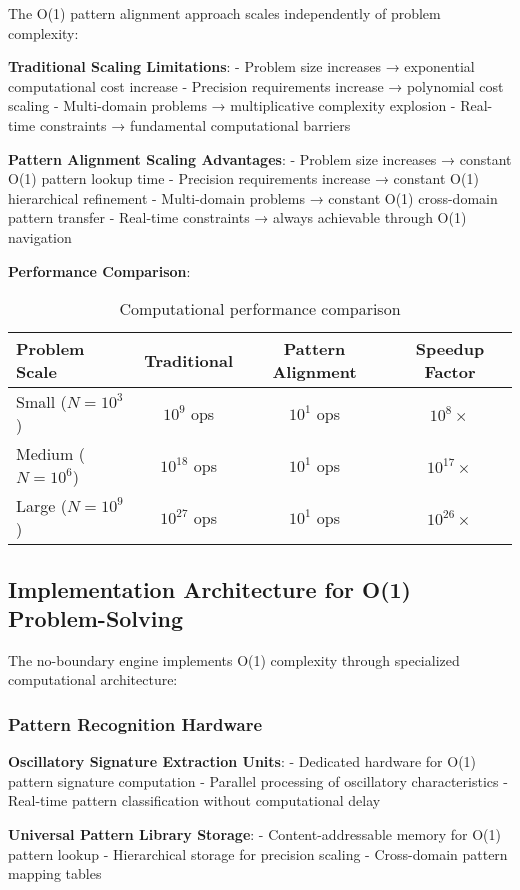 \documentclass[11pt,a4paper]{article}
\theoremstyle{remark}
\begin{document}
The O(1) pattern alignment approach scales independently of problem complexity:

\textbf{Traditional Scaling Limitations}:
- Problem size increases → exponential computational cost increase
- Precision requirements increase → polynomial cost scaling  
- Multi-domain problems → multiplicative complexity explosion
- Real-time constraints → fundamental computational barriers

\textbf{Pattern Alignment Scaling Advantages}:
- Problem size increases → constant O(1) pattern lookup time
- Precision requirements increase → constant O(1) hierarchical refinement
- Multi-domain problems → constant O(1) cross-domain pattern transfer
- Real-time constraints → always achievable through O(1) navigation

\textbf{Performance Comparison}:
\begin{table}[H]
\centering
\begin{tabular}{lccc}
\toprule
Problem Scale & Traditional & Pattern Alignment & Speedup Factor \\
\midrule
Small ($N = 10^3$) & $10^9$ ops & $10^1$ ops & $10^8\times$ \\
Medium ($N = 10^6$) & $10^{18}$ ops & $10^1$ ops & $10^{17}\times$ \\
Large ($N = 10^9$) & $10^{27}$ ops & $10^1$ ops & $10^{26}\times$ \\
\bottomrule
\end{tabular}
\caption{Computational performance comparison}
\end{table}

\subsection{Implementation Architecture for O(1) Problem-Solving}

The no-boundary engine implements O(1) complexity through specialized computational architecture:

\subsubsection{Pattern Recognition Hardware}

\textbf{Oscillatory Signature Extraction Units}:
- Dedicated hardware for O(1) pattern signature computation
- Parallel processing of oscillatory characteristics
- Real-time pattern classification without computational delay

\textbf{Universal Pattern Library Storage}:
- Content-addressable memory for O(1) pattern lookup
- Hierarchical storage for precision scaling
- Cross-domain pattern mapping tables
\end{document}
